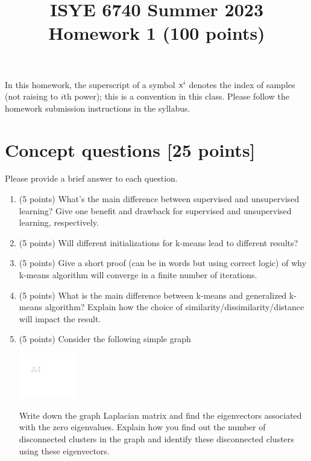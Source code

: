 \documentclass[twoside,10pt]{article}
\begin{document}
\title{ISYE 6740 Summer 2023\\ Homework 1 (100 points)}
\date{}

\maketitle

\vspace{-.5in}

In this homework, the superscript of a symbol $\text x^i$ denotes the index of samples (not raising to $i$th power); this is a convention in this class. Please follow the homework submission instructions in the syllabus.

\section{Concept questions [25 points]}

Please provide a brief answer to each question.

\begin{enumerate}

\item (5 points) What's the main difference between supervised and unsupervised learning? Give one benefit and drawback for supervised and unsupervised learning, respectively. 

\item (5 points) Will different initializations for k-means lead to different results?

\item (5 points) Give a short proof (can be in words but using correct logic) of why k-means algorithm will converge in a finite number of iterations.

\item (5 points) What is the main difference between k-means and generalized k-means algorithm? Explain how the choice of similarity/dissimilarity/distance will impact the result. 

\item (5 points) Consider the following simple graph
\begin{center}
\includegraphics[width = 0.2\textwidth]{plot}
\end{center}

Write down the graph Laplacian matrix and find the eigenvectors associated with the zero eigenvalues. Explain how you find out the number of disconnected clusters in the graph and identify these disconnected clusters using these eigenvectors.

\end{enumerate}
\end{document}
